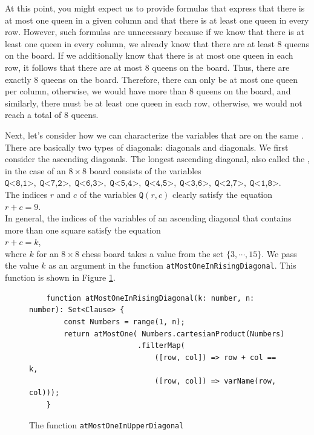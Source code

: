 At this point, you might expect us to provide formulas that express that there is at most one queen in a given column and that there is at least one queen in every row.
However, such formulas are unnecessary because if we know that there is at least one queen in every column, we already know that there are at least 8 queens on the board.
If we additionally know that there is at most one queen in each row, it follows that there are at most 8 queens on the board. Thus, there are exactly
8 queens on the board. Therefore, there can only be at most one queen per column, otherwise, we would have more than 8 queens on the board, and similarly, there must be at least one queen in each row, otherwise, we would not reach a total of 8 queens.

Next, let's consider how we can characterize the variables that are on the same .
There are basically two types of diagonals:  diagonals and  diagonals. We first consider
the ascending diagonals. The longest ascending diagonal, also called the
, in the case of an $8 \times 8$ board consists of the
variables \\[0.2cm]
\hspace*{1.3cm} 
$\texttt{Q<8,1>},\; \texttt{Q<7,2>},\; \texttt{Q<6,3>},\; \texttt{Q<5,4>},\; \texttt{Q<4,5>},\; \texttt{Q<3,6>},\; 
 \texttt{Q<2,7>},\; \texttt{Q<1,8>}$.
\\[0.2cm]
The indices $r$ and $c$ of the variables $\texttt{Q}(r,c)$ clearly satisfy
the equation \\[0.2cm]
\hspace*{1.3cm} $r + c = 9$. \\[0.2cm]
In general, the indices of the variables of an ascending diagonal that contains more than one square satisfy the
equation \\[0.2cm] 
\hspace*{1.3cm} $r + c = k$, \\[0.2cm]
where $k$ for an $8 \times 8$ chess board takes a value from the set $\{3, \cdots, 15 \}$. We pass the value $k$ as an argument in the
function \texttt{atMostOneInRisingDiagonal}. This function is shown in Figure
\ref{fig:atMostOneInUpperDiagonal}.


\begin{figure}[!ht]
  \centering
\begin{verbatim}
    function atMostOneInRisingDiagonal(k: number, n: number): Set<Clause> {
        const Numbers = range(1, n);
        return atMostOne( Numbers.cartesianProduct(Numbers)
                         .filterMap(
                             ([row, col]) => row + col == k,
                             ([row, col]) => varName(row, col)));
    }
\end{verbatim}
\vspace*{-0.3cm}
  \caption{The function \texttt{atMostOneInUpperDiagonal}}
  \label{fig:atMostOneInUpperDiagonal}
\end{figure}

